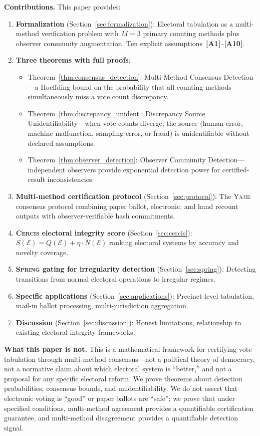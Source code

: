 \documentclass[11pt,a4paper]{article}
\theoremstyle{definition}
\newcommand{\Yajie}{\textsc{Yajie}}
\newcommand{\Spring}{\textsc{Spring}}
\newcommand{\Cercis}{\textsc{Cercis}}
\newcommand{\assumptionTag}[1]{\textsf{\textbf{[A#1]}}}
\begin{document}
\textbf{Contributions.} This paper provides:
\begin{enumerate}[label=(\roman*)]
    \item \textbf{Formalization} (Section~\ref{sec:formalization}): Electoral tabulation as a multi-method verification problem with $M = 3$ primary counting methods plus observer community augmentation. Ten explicit assumptions~\assumptionTag{1}--\assumptionTag{10}.
    \item \textbf{Three theorems with full proofs}:
    \begin{itemize}
        \item Theorem~\ref{thm:consensus_detection}: Multi-Method Consensus Detection---a Hoeffding bound on the probability that all counting methods simultaneously miss a vote count discrepancy.
        \item Theorem~\ref{thm:discrepancy_unident}: Discrepancy Source Unidentifiability---when vote counts diverge, the source (human error, machine malfunction, sampling error, or fraud) is unidentifiable without declared assumptions.
        \item Theorem~\ref{thm:observer_detection}: Observer Community Detection---independent observers provide exponential detection power for certified-result inconsistencies.
    \end{itemize}
    \item \textbf{Multi-method certification protocol} (Section~\ref{sec:protocol}): The \Yajie{} consensus protocol combining paper ballot, electronic, and hand recount outputs with observer-verifiable hash commitments.
    \item \textbf{\Cercis{} electoral integrity score} (Section~\ref{sec:cercis}): $S(\mathcal{E}) = Q(\mathcal{E}) + \eta \cdot N(\mathcal{E})$ ranking electoral systems by accuracy and novelty coverage.
    \item \textbf{\Spring{} gating for irregularity detection} (Section~\ref{sec:spring}): Detecting transitions from normal electoral operations to irregular regimes.
    \item \textbf{Specific applications} (Section~\ref{sec:applications}): Precinct-level tabulation, mail-in ballot processing, multi-jurisdiction aggregation.
    \item \textbf{Discussion} (Section~\ref{sec:discussion}): Honest limitations, relationship to existing electoral integrity frameworks.
\end{enumerate}
\textbf{What this paper is not.} This is a mathematical framework for certifying vote tabulation through multi-method consensus---not a political theory of democracy, not a normative claim about which electoral system is ``better,'' and not a proposal for any specific electoral reform. We prove theorems about detection probabilities, consensus bounds, and unidentifiability. We do not assert that electronic voting is ``good'' or paper ballots are ``safe''; we prove that under specified conditions, multi-method agreement provides a quantifiable certification guarantee, and multi-method disagreement provides a quantifiable detection signal.
\end{document}
